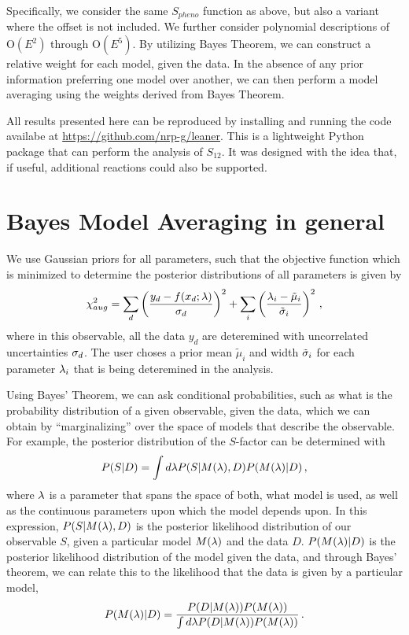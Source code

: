 \documentclass[prd,10pt,superscriptaddress,notitlepage,tightenlines,nofootinbib,floatfix]{revtex4-1}
\begin{document}
Specifically, we consider the same $S_{pheno}$ function as above, but also a variant where the offset is not included.  We further consider polynomial descriptions of $\mathrm{O}(E^2)$ through $\mathrm{O}(E^5)$.
By utilizing Bayes Theorem, we can construct a relative weight for each model, given the data.  In the absence of any prior information preferring one model over another, we can then perform a model averaging using the weights derived from Bayes Theorem.

All results presented here can be reproduced by installing and running the code availabe at \url{https://github.com/nrp-g/leaner}.
This is a lightweight Python package that can perform the analysis of $S_{12}$.  It was designed with the idea that, if useful, additional reactions could also be supported.


\section{Bayes Model Averaging in general \label{sec:bma}}

We use Gaussian priors for all parameters, such that the objective function which is minimized to determine the posterior distributions of all parameters is given by
\begin{equation}
\chi^2_{aug} = \sum_d \left( \frac{y_d - f(x_d;{\lambda})}{{\sigma}_d}\right)^2 
    + \sum_i \left( \frac{{\lambda}_i - \tilde{\mu}_i}{\tilde{{\sigma}}_i} \right)^2\, ,
\end{equation}
where in this observable, all the data $y_d$ are deteremined with uncorrelated uncertainties ${\sigma}_d$.
The user choses a prior mean $\tilde{\mu}_i$ and width $\tilde{{\sigma}}_i$ for each parameter ${\lambda}_i$ that is being deteremined in the analysis.





Using Bayes' Theorem, we can ask conditional probabilities, such as what is the probability distribution of a given observable, given the data, which we can obtain by ``marginalizing'' over the space of models that describe the observable.  For example, the posterior distribution of the $S$-factor can be determined with 
\begin{equation}
P(S | D) = \int d{\lambda} P(S | M({\lambda}), D) P(M({\lambda}) | D)\, ,
\end{equation}
where ${\lambda}$ is a parameter that spans the space of both, what model is used, as well as the continuous parameters upon which the model depends upon.
In this expression, $P(S | M({\lambda}), D)$ is the posterior likelihood distribution of our observable $S$, given a particular model $M({\lambda})$ and the data $D$.
$P(M({\lambda}) | D)$ is the posterior likelihood distribution of the model given the data, and through Bayes' theorem, we can relate this to the likelihood that the data is given by a particular model, 
\begin{equation}
P(M({\lambda})|D) = \frac{P(D|M({\lambda})) P(M({\lambda}))}{\int d{\lambda} P(D|M({\lambda}))P(M({\lambda}))}\, .
\end{equation}
\end{document}
